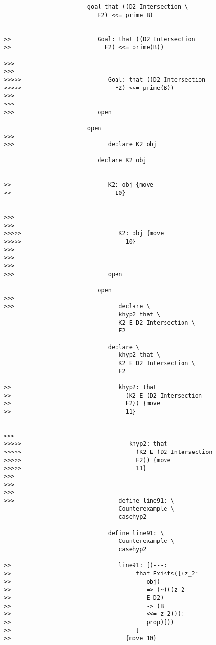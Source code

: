 \documentclass[12pt]{article}
\begin{document}
\begin{verbatim}
                        goal that ((D2 Intersection \
                           F2) <<= prime B)


>>                         Goal: that ((D2 Intersection
>>                           F2) <<= prime(B))

>>>
>>>
>>>>>                         Goal: that ((D2 Intersection
>>>>>                           F2) <<= prime(B))
>>>
>>>
>>>                        open

                        open
>>>
>>>                           declare K2 obj

                           declare K2 obj


>>                            K2: obj {move
>>                              10}


>>>
>>>
>>>>>                            K2: obj {move
>>>>>                              10}
>>>
>>>
>>>
>>>                           open

                           open
>>>
>>>                              declare \
                                 khyp2 that \
                                 K2 E D2 Intersection \
                                 F2

                              declare \
                                 khyp2 that \
                                 K2 E D2 Intersection \
                                 F2

>>                               khyp2: that
>>                                 (K2 E (D2 Intersection
>>                                 F2)) {move
>>                                 11}


>>>
>>>>>                               khyp2: that
>>>>>                                 (K2 E (D2 Intersection
>>>>>                                 F2)) {move
>>>>>                                 11}
>>>
>>>
>>>
>>>                              define line91: \
                                 Counterexample \
                                 casehyp2

                              define line91: \
                                 Counterexample \
                                 casehyp2

>>                               line91: [(---:
>>                                    that Exists([(z_2:
>>                                       obj)
>>                                       => (~(((z_2
>>                                       E D2)
>>                                       -> (B
>>                                       <<= z_2))):
>>                                       prop)]))
>>                                    ]
>>                                 {move 10}



\end{verbatim}
\end{document}

